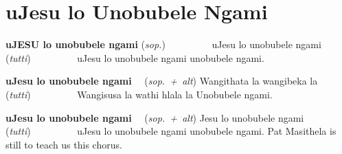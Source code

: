\starttocol
\chapter{uJesu lo Unobubele Ngami}
\nexttocol
\hfill{\it }
\stoptocol
\starttocol
\startlines
{\bf uJ{\small\bf ESU} lo unobubele ngami} \hfill({\it sop.})~~~~~~~~~
uJesu lo unobubele ngami \hfill({\it tutti})~~~~~~~~~
uJesu lo unobubele ngami
unobubele ngami.

{\bf uJesu lo unobubele ngami}~~ ({\it sop.~+~alt})
Wangithata la wangibeka la \hfill({\it tutti})~~~~~~~~~
Wangisusa la wathi hlala la
Unobubele ngami.

{\bf uJesu lo unobubele ngami}~~ ({\it sop.~+~alt})
Jesu lo unobubele ngami \hfill({\it tutti})~~~~~~~~~
uJesu lo unobubele ngami
unobubele ngami.
\stoplines
\nexttocol
Pat Masithela is still to teach us this chorus.
\stoptocol
